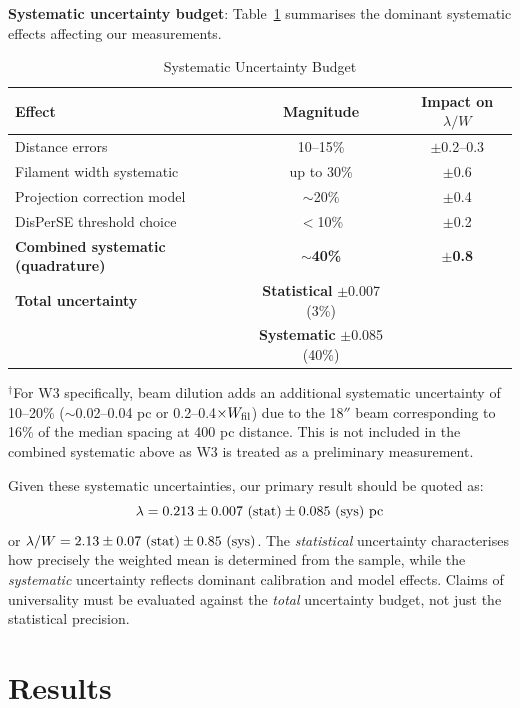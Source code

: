 \documentclass[11pt,a4paper]{article}
\begin{document}
\textbf{Systematic uncertainty budget}: Table~\ref{tab:uncertainties} summarises the dominant systematic effects affecting our measurements.

\begin{table}[H]
\centering
\caption{Systematic Uncertainty Budget}
\label{tab:uncertainties}
\begin{tabular}{lcc}
\toprule
Effect & Magnitude & Impact on $\lambda/W$ \\
\midrule
Distance errors & 10--15\% & $\pm$0.2--0.3 \\
Filament width systematic & up to 30\% & $\pm$0.6 \\
Projection correction model & $\sim$20\% & $\pm$0.4 \\
DisPerSE threshold choice & $<$10\% & $\pm$0.2 \\
\textbf{Combined systematic (quadrature)} & \textbf{$\sim$40\%} & \textbf{$\pm$0.8} \\
\midrule
\textbf{Total uncertainty} & \textbf{Statistical} $\pm$0.007 (3\%) & \\
& \textbf{Systematic} $\pm$0.085 (40\%) & \\
\bottomrule
\end{tabular}
\vspace{-0.5em}
\small{$^{\dagger}$For W3 specifically, beam dilution adds an additional systematic uncertainty of 10--20\% ($\sim$0.02--0.04 pc or 0.2--0.4$\times W_{\rm fil}$) due to the 18$''$ beam corresponding to 16\% of the median spacing at 400 pc distance. This is not included in the combined systematic above as W3 is treated as a preliminary measurement.}
\end{table}

Given these systematic uncertainties, our primary result should be quoted as:
\begin{equation}
\lambda = 0.213 \pm 0.007~({\rm stat}) \pm 0.085~({\rm sys})~{\rm pc}
\end{equation}
or $\lambda/W = 2.13 \pm 0.07~({\rm stat}) \pm 0.85~({\rm sys})$. The \textit{statistical} uncertainty characterises how precisely the weighted mean is determined from the sample, while the \textit{systematic} uncertainty reflects dominant calibration and model effects. Claims of universality must be evaluated against the \textit{total} uncertainty budget, not just the statistical precision.

\section{Results}
\end{document}
